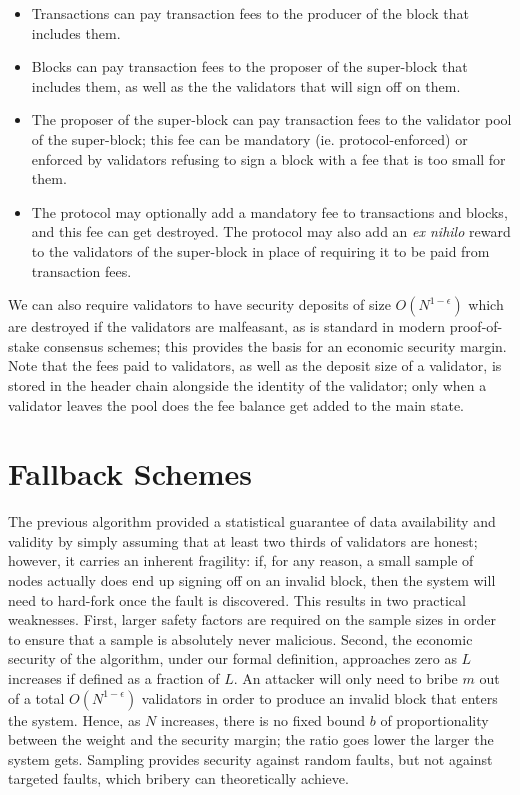 \documentclass[11pt,a4paper]{report}
\theoremstyle{plain}
\theoremstyle{definition}
\theoremstyle{remark}
\begin{document}
\begin{itemize}
\item
Transactions can pay transaction fees to the producer of the block that includes them.
\item
Blocks can pay transaction fees to the proposer of the super-block that includes them, as well as the the validators that will sign off on them.
\item
The proposer of the super-block can pay transaction fees to the validator pool of the super-block; this fee can be mandatory (ie. protocol-enforced) or enforced by validators refusing to sign a block with a fee that is too small for them.
\item
The protocol may optionally add a mandatory fee to transactions and blocks, and this fee can get destroyed. The protocol may also add an \emph{ex nihilo} reward to the validators of the super-block in place of requiring it to be paid from transaction fees.
\end{itemize}

We can also require validators to have security deposits of size $O(N^{1-\epsilon})$ which are destroyed if the validators are malfeasant, as is standard in modern proof-of-stake consensus schemes; this provides the basis for an economic security margin. Note that the fees paid to validators, as well as the deposit size of a validator, is stored in the header chain alongside the identity of the validator; only when a validator leaves the pool does the fee balance get added to the main state.

\chapter{Fallback Schemes}

The previous algorithm provided a statistical guarantee of data availability and validity by simply assuming that at least two thirds of validators are honest; however, it carries an inherent fragility: if, for any reason, a small sample of nodes actually does end up signing off on an invalid block, then the system will need to hard-fork once the fault is discovered. This results in two practical weaknesses. First, larger safety factors are required on the sample sizes in order to ensure that a sample is absolutely never malicious. Second, the economic security of the algorithm, under our formal definition, approaches zero as $L$ increases if defined as a fraction of $L$. An attacker will only need to bribe $m$ out of a total $O(N^{1-\epsilon})$ validators in order to produce an invalid block that enters the system. Hence, as $N$ increases, there is no fixed bound $b$ of proportionality between the weight and the security margin; the ratio goes lower the larger the system gets. Sampling provides security against random faults, but not against targeted faults, which bribery can theoretically achieve.
\end{document}
